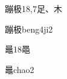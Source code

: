 \begin{entry}{蹦极}{18,7}{⾜、⽊}
  \begin{phonetics}{蹦极}{beng4ji2}
  \end{phonetics}
\end{entry}

\begin{entry}{鼂}{18}{⿌}
  \begin{phonetics}{鼂}{chao2}
  \end{phonetics}
\end{entry}



